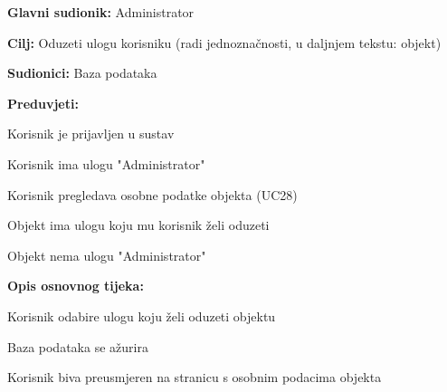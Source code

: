 					\noindent {}
					\begin{packed_item}
	
						\item \textbf{Glavni sudionik: }Administrator
						\item  \textbf{Cilj:} Oduzeti ulogu korisniku (radi jednoznačnosti, u daljnjem tekstu: objekt)
						\item  \textbf{Sudionici:} Baza podataka
						\item  \textbf{Preduvjeti:}
						\item[] \begin{packed_enum}
							\item Korisnik je prijavljen u sustav
							\item Korisnik ima ulogu "Administrator"
							\item Korisnik pregledava osobne podatke objekta (UC28)
							\item Objekt ima ulogu koju mu korisnik želi oduzeti
							\item Objekt nema ulogu "Administrator"
						\end{packed_enum}
						\item  \textbf{Opis osnovnog tijeka:}
						
						\item[] \begin{packed_enum}
	
							\item Korisnik odabire ulogu koju želi oduzeti objektu
							\item Baza podataka se ažurira
							\item Korisnik biva preusmjeren na stranicu s osobnim podacima objekta
						\end{packed_enum}
						
					\end{packed_item}
					
